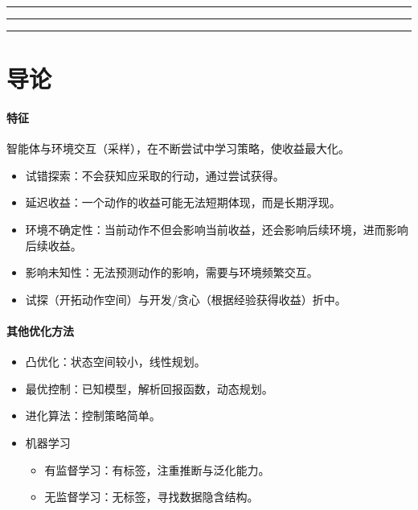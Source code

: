 \documentclass[
12pt, %
a4paper, 
oneside, %
headinclude,footinclude, %
]{scrartcl}
\title{\normalfont\spacedallcaps{强化学习}}
\date{}
\begin{document}
\maketitle
\newpage
\hypertarget{toc}{}
\begingroup
\begin{multicols}{2}
\tableofcontents
\end{multicols}
\endgroup
\newpage
\begingroup
\begin{multicols}{2}
\listoffigures
\end{multicols}
\endgroup
\hrule
\begingroup
\begin{multicols}{2}
\listoftables
\end{multicols}
\endgroup
\hrule
\listofalgorithms
\vspace{1em}
\hrule
\listoftips
\newpage
\section{导论}
\paragraph{特征}
智能体与环境交互（采样），在不断尝试中学习策略，使收益最大化。
\begin{itemize}
\item 试错探索：不会获知应采取的行动，通过尝试获得。
\item 延迟收益：一个动作的收益可能无法短期体现，而是长期浮现。
\item 环境不确定性：当前动作不但会影响当前收益，还会影响后续环境，进而影响后续收益。
\item 影响未知性：无法预测动作的影响，需要与环境频繁交互。
\item 试探（开拓动作空间）与开发/贪心（根据经验获得收益）折中。
\end{itemize}
\paragraph{其他优化方法}
\begin{itemize}
\item 凸优化：状态空间较小，线性规划。
\item 最优控制：已知模型，解析回报函数，动态规划。
\item 进化算法：控制策略简单。
\item 机器学习
\begin{itemize}
\item 有监督学习：有标签，注重推断与泛化能力。
\item 无监督学习：无标签，寻找数据隐含结构。
\end{itemize}
\end{itemize}
\end{document}
